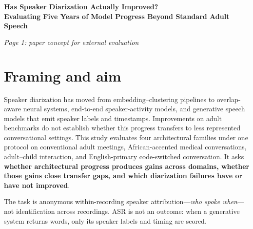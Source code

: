 \documentclass[9pt]{extarticle}
\begin{document}
\pagestyle{empty}

\begin{center}
  {\fontsize{14}{15.5}\selectfont\bfseries
  Has Speaker Diarization Actually Improved?\\[-1pt]
  Evaluating Five Years of Model Progress Beyond Standard Adult Speech}

  \vspace{1.5pt}
  {\itshape Page 1: paper concept for external evaluation}
\end{center}

\section*{Framing and aim}

Speaker diarization has moved from embedding--clustering pipelines to
overlap-aware neural systems, end-to-end speaker-activity models, and
generative speech models that emit speaker labels and timestamps. Improvements
on adult benchmarks do not establish whether this progress transfers to less
represented conversational settings. This study evaluates four architectural
families under one protocol on conventional adult meetings, African-accented
medical conversations, adult--child interaction, and English-primary
code-switched conversation. It asks \textbf{whether architectural progress
produces gains across domains, whether those gains close transfer gaps, and
which diarization failures have or have not improved}.

The task is anonymous within-recording speaker attribution---\emph{who spoke
when}---not identification across recordings. ASR is not an outcome: when a
generative system returns words, only its speaker labels and timing are scored.
\end{document}

